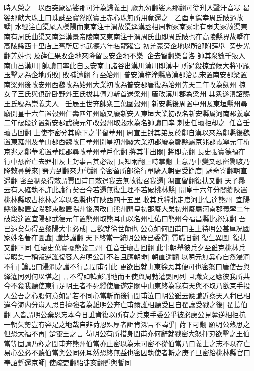 時人榮之　以西突厥曷娑那可汗為歸義王|{
	厥九勿翻娑素那翻可從刋入聲汗音寒}
曷娑那獻大珠上曰珠誠至寶然朕寶王赤心珠無所用竟還之　乙酉車駕幸周氏陂過故墅|{
	水經注白渠尾入櫟陽而東南注于渭故渠逕漢丞相周勃冢南冢北有弱夫冢故渠東南有周氏曲渠又南逕漢景帝陵南又東南注于渭周氏曲即周氏陂也在高陵縣界故墅在高陵縣西十里店上舊所居也武德六年名龍躍宫}
初羌豪旁企地以所部附薛舉|{
	旁步光翻羌姓也}
及薛仁果敗企地來降留長安企地不樂|{
	企去智翻樂音洛}
帥其衆數千叛入南山出漢川|{
	帥讀曰率此自長安南山諸谷出漢川漢川即漢中}
所過殺掠武候大將軍龎玉擊之為企地所敗|{
	敗補邁翻}
行至始州|{
	普安漢梓潼縣廣漢郡治焉宋置南安郡梁置南梁州後改安州西魏改為始州大業初改為普安郡唐復為始州先天二年改為劒州}
掠女子王氏與俱醉卧野外王氏拔其佩刀斬首送梁州|{
	唐改漢川郡為梁州}
其衆遂潰詔賜王氏號為崇義夫人　壬辰王世充帥衆三萬圍穀州|{
	新安縣後周置中州及東垣縣州尋廢開皇十六年置穀州仁壽四年州廢又廢新安入東垣大業初改名新安縣屬河南郡義寧二年破段達置新安郡武德元年改穀州取穀水為名帥讀曰率}
刺史任瓌拒却之|{
	任音壬瓌古回翻}
上使李密分其麾下之半留華州|{
	周宣王封其弟友於鄭自漢以來為鄭縣後魏置東雍州及華山郡西魏改曰華州開皇初州廢大業初郡廢為鄭縣屬京兆郡義寧元年析京兆之鄭華隂置華隂郡尋改華州華戶化翻}
將其半出關|{
	將即亮翻}
長史張寶德預在行中恐密亡去罪相及上封事言其必叛|{
	長知兩翻上時掌翻}
上意乃中變又恐密驚駭乃降敕書勞來|{
	勞力到翻來力代翻}
令密留所部徐行單騎入朝更受節度|{
	騎奇寄翻朝直遥翻}
密至稠桑得敕謂賈閏甫曰敕遣我去無故復召我還|{
	稠直留翻復扶又翻}
天子曏云有人確執不許此譖行矣吾今若還無復生理不若破桃林縣|{
	開皇十六年分閿鄉陜置桃林縣取古桃林之塞以名縣也在陜西四十五里}
收其兵糧北走度河比信達熊州|{
	宜陽縣後魏置宜陽郡東魏置陽州後周改曰熊州開皇初郡廢大業初州廢屬河南郡義寧二年破段達置宜陽郡武德元年置熊州取熊耳山以名州杜佑曰熊州今福昌縣比必寐翻}
吾已遠矣苟得至黎陽大事必成|{
	言欲就徐世勣也}
公意如何閏甫曰主上待明公甚厚况國家姓名著在圖䜟|{
	䜟楚譛翻}
天下終當一統明公既已委質|{
	質職日翻}
復生異圖|{
	復扶又翻下同}
任瓌史萬寶據熊穀二州|{
	任音壬瓌古回翻}
此事朝舉彼兵夕至雖克桃林兵豈暇集一稱叛逆誰復容人為明公計不若且應朝命|{
	朝直遥翻}
以明元無異心自然浸潤不行|{
	論語曰浸潤之譖不行焉閏甫引此}
更欲出就山東徐思其便可也密怒曰唐使吾與絳灌同列何以堪之|{
	言不得如韓彭割地而王使與周勃灌嬰同列}
且䜟文之應彼我所共今不殺我聽使東行足明王者不死縱使唐遂定關中山東終為我有天與不取乃欲束手投人公吾之心腹何意如是若不同心當斬而後行閏甫泣曰明公雖云應䜟近察天人稍已相違今海内分崩人思自擅強者為雄明公奔亡甫爾誰相聽受且自翟讓受戮之後|{
	翟萇伯翻}
人皆謂明公棄恩忘本今日誰肯復以所有之兵束手委公乎彼必慮公見奪逆相拒抗一朝失勢豈有容足之地哉自非荷恩殊厚者詎肯深言不諱乎|{
	荷下可翻}
願明公熟思之但恐大福不再|{
	楚靈王之言}
苟明公有所措身閏甫亦何辭就戮密大怒揮刃欲擊之王伯當等固請乃釋之閏甫奔熊州伯當亦止密以為未可密不從伯當乃曰義士之志不以存亡易心公必不聽伯當與公同死耳然恐終無益也密因執使者斬之庚子旦密紿桃林縣官曰奉詔蹔還京師|{
	使疏吏翻紿徒亥翻蹔與暫同}
